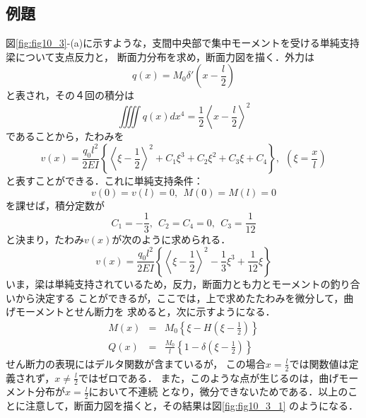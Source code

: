 \documentclass[10pt,a4j]{jarticle}
\begin{document}
\subsection{例題}
図\ref{fig:fig10_3}-(a)に示すような，支間中央部で集中モーメントを受ける単純支持梁について支点反力と，
断面力分布を求め，断面力図を描く．外力は
\begin{equation}
	q(x)=M_0\delta'\left(x-\frac{l}{2}\right)
\end{equation}
と表され，その４回の積分は
\begin{equation}
	\iiiint q(x)dx^4 =\frac{1}{2}\left< x-\frac{l}{2}\right>^2
\end{equation}
であることから，たわみを
\begin{equation}
	v(x)=\frac{q_0l^2}{2EI}\left\{ \left< \xi -\frac{1}{2} \right>^2+C_1\xi^3 +C_2\xi^2+C_3\xi+C_4\right\}, \ \ 
	\left(\xi=\frac{x}{l}\right)
\end{equation}
と表すことができる．これに単純支持条件：
\begin{equation}
	v(0)=v(l)=0, \ \ M(0)=M(l)=0
\end{equation}
を課せば，積分定数が
\begin{equation}
	C_1=-\frac{1}{3}, \ \ C_2=C_4=0, \ \ C_3=\frac{1}{12}
\end{equation}
と決まり，たわみ$v(x)$が次のように求められる．
\begin{equation}
	v(x)=\frac{q_0l^2}{2EI}\left\{ \left< \xi -\frac{1}{2} \right>^2-\frac{1}{3}\xi^3 +\frac{1}{12}\xi \right\}
\end{equation}
いま，梁は単純支持されているため，反力，断面力とも力とモーメントの釣り合いから決定する
ことができるが，ここでは，上で求めたたわみを微分して，曲げモーメントとせん断力を
求めると，次に示すようになる．
\begin{eqnarray}
	M(x) &= & 
		M_0\left\{ \xi -H \left(\xi-\frac{1}{2}\right) \right\} \\
	Q(x) &= & 
		\frac{M_0}{l}\left\{1 -\delta\left(\xi-\frac{1}{2}\right)  \right\}
\end{eqnarray}
せん断力の表現にはデルタ関数が含まているが，
この場合$x=\frac{l}{2}$では関数値は定義されず，$x\neq \frac{l}{2}$ではゼロである．
また，このような点が生じるのは，曲げモーメント分布が$x=\frac{l}{2}$において不連続
となり，微分できないためである．以上のことに注意して，断面力図を描くと，その結果は図\ref{fig:fig10_3_1}
のようになる．
\end{document}
